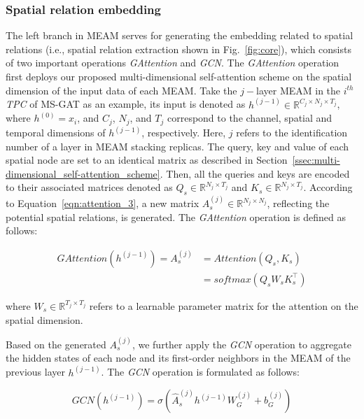 \subsubsection{Spatial relation embedding}
The left branch in MEAM serves for generating the embedding related to spatial relations (i.e., spatial relation extraction shown in Fig.~\ref{fig:core}), which consists of two important operations \textit{GAttention} and \textit{GCN}. The \textit{GAttention} operation first deploys our proposed multi-dimensional self-attention scheme on the spatial dimension of the input data of each MEAM. Take the $j-$layer MEAM in the $i^{th}$ \textit{TPC} of MS-GAT as an example, its input is denoted as $h^{(j-1)} \in \mathbb{R}^{C_j \times N_j \times T_j}$, where $h^{(0)} = x_i$, and $C_j$, $N_j$, and $T_j$ correspond to the channel, spatial and temporal dimensions of $h^{(j-1)}$, respectively. Here, $j$ refers to the identification number of a layer in MEAM stacking replicas. The query, key and value of each spatial node are set to an identical matrix as described in Section~\ref{ssec:multi-dimensional_self-attention_scheme}. Then, all the queries and keys are encoded to their associated matrices denoted as $Q_s \in \mathbb{R}^{N_j \times T_j}$ and $K_s \in \mathbb{R}^{N_j \times T_j}$. According to Equation~\ref{eqn:attention_3}, a new matrix $A_s^{(j)} \in \mathbb{R}^{N_j \times N_j}$, reflecting the potential spatial relations, is generated. The \textit{GAttention} operation is defined as follows:

\begin{equation}
    \label{eqn:graph_attention}
    \begin{aligned}
        GAttention(h^{(j-1)}) = A_s^{(j)} & = Attention(Q_s, K_s)      \\
                                          & = softmax(Q_s W_s K_s^\top)
    \end{aligned}
\end{equation}

where $W_s \in \mathbb{R}^{T_j \times T_j}$ refers to a learnable parameter matrix for the attention on the spatial dimension.

Based on the generated $A_s^{(j)}$, we further apply the \textit{GCN} operation to aggregate the hidden states of each node and its first-order neighbors in the MEAM of the previous layer $h^{(j-1)}$. The \textit{GCN} operation is formulated as follows:

\begin{equation}
    \label{eqn:graph_convolution}
    GCN(h^{(j-1)}) =\sigma(\hat{A}_s^{(j)} h^{(j-1)} W_G^{(j)} + b_G^{(j)})
\end{equation}

